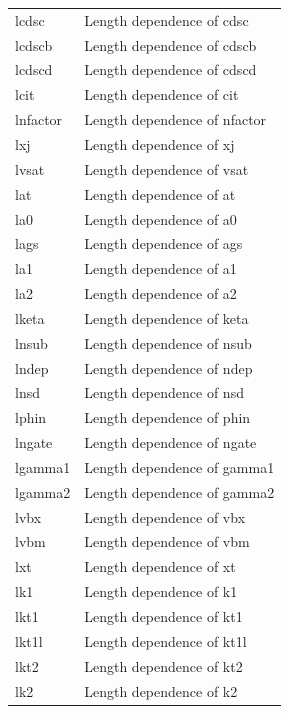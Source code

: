 \begin{longtable}{l l}
{\small lcdsc} & {\small Length dependence of cdsc} \\
{\small lcdscb} & {\small Length dependence of cdscb} \\
{\small lcdscd} & {\small Length dependence of cdscd} \\
{\small lcit} & {\small Length dependence of cit} \\
{\small lnfactor} & {\small Length dependence of nfactor} \\
{\small lxj} & {\small Length dependence of xj} \\
{\small lvsat} & {\small Length dependence of vsat} \\
{\small lat} & {\small Length dependence of at} \\
{\small la0} & {\small Length dependence of a0} \\ 
{\small lags} & {\small Length dependence of ags} \\ 
{\small la1} & {\small Length dependence of a1} \\
{\small la2} & {\small Length dependence of a2} \\
{\small lketa} & {\small Length dependence of keta} \\
{\small lnsub} & {\small Length dependence of nsub} \\
{\small lndep} & {\small Length dependence of ndep} \\
{\small lnsd} & {\small Length dependence of nsd} \\
{\small lphin} & {\small Length dependence of phin} \\
{\small lngate} & {\small Length dependence of ngate} \\
{\small lgamma1} & {\small Length dependence of gamma1} \\
{\small lgamma2} & {\small Length dependence of gamma2} \\
{\small lvbx} & {\small Length dependence of vbx} \\
{\small lvbm} & {\small Length dependence of vbm} \\
{\small lxt} & {\small Length dependence of xt} \\
{\small lk1} & {\small Length dependence of k1} \\
{\small lkt1} & {\small Length dependence of kt1} \\
{\small lkt1l} & {\small Length dependence of kt1l} \\
{\small lkt2} & {\small Length dependence of kt2} \\
{\small lk2} & {\small Length dependence of k2} \\

\end{longtable}
